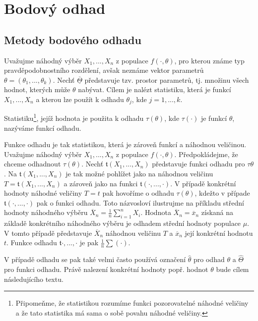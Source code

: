 \chapter{Bodový odhad}

\section{Metody bodového odhadu}

Uvažujme náhodný výběr $X_1, ..., X_n$ z populace $f(\cdot, \theta)$, pro kterou známe typ pravděpodobnostního rozdělení, avšak neznáme vektor parametrů $\theta = (\theta_1, ..., \theta_k)$. Nechť $\overline{\underline{\Theta}}$ představuje tzv. prostor parametrů, tj. množinu všech hodnot, kterých může $\theta$ nabývat. Cílem je nalézt statistiku, která je funkcí $X_1, ..., X_n$ a kterou lze použít k odhadu $\theta_j$, kde $j = 1, ..., k$.

\begin{definition}[Odhad]
Statistiku\footnote{Připomeňme, že statistikou rozumíme funkci pozorovatelné náhodné veličiny a že tato statistika má sama o sobě povahu náhodné veličiny.}, jejíž hodnota je použita k odhadu $\tau(\theta)$, kde $\tau(\cdot)$ je funkcí $\theta$, nazýváme funkcí odhadu.
\end{definition}

Funkce odhadu je tak statistikou, která je zároveň funkcí a náhodnou veličinou. Uvažujme náhodný výběr $X_1, ..., X_n$ z populace $f(\cdot, \theta)$. Předpokládejme, že chceme odhadnout $\tau(\theta)$. Nechť $\mathfrak{t}(X_1, ..., X_n)$ představuje funkci odhadu pro $\tau{\theta}$. Na $\mathfrak{t}(X_1, ..., X_n)$ je tak možné pohlížet jako na náhodnou veličinu $T = \mathfrak{t}(X_1, ..., X_n)$ a zároveň jako na funkci $\mathfrak{t}(\cdot, ..., \cdot)$. V případě konkrétní hodnoty náhodné veličiny $T = t$ pak hovoříme o odhadu $\tau(\theta)$, kdežto v případe $\mathfrak{t}(\cdot, ..., \cdot)$ pak o funkci odhadu. Toto názvosloví ilustrujme na příkladu střední hodnoty náhodného výběru $\overline{X}_n = \frac{1}{n}\sum_{i = 1}^n X_i$. Hodnota $\overline{X}_n = \overline{x}_n$ získaná na základě konkrétního náhodného výběru je odhadem střední hodnoty populace $\mu$. V tomto případě představuje $\overline{X}_n$ náhodnou veličinu $T$ a $\overline{x}_n$ její konkrétní hodnotu $t$. Funkce odhadu $\mathfrak{t}{\cdot, ..., \cdot}$ je pak $\frac{1}{n}\sum (\cdot)$.

V případě odhadu se pak také velmi často používá označení $\hat{\theta}$ pro odhad $\theta$ a $\hat{\Theta}$ pro funkci odhadu. Právě nalezení konkrétní hodnoty popř. hodnot $\theta$ bude cílem následujícího textu.

